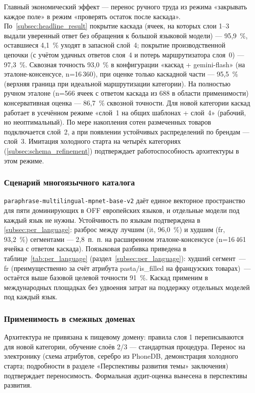Главный экономический эффект — перенос ручного труда из режима «закрывать каждое поле» в режим «проверять остаток после каскада». По~\ref{subsec:headline_result} покрытие каскада (ячеек, на которых слои 1--3 выдали уверенный ответ без обращения к большой языковой модели) — 95,9~\%, оставшиеся 4,1~\% уходят в запасной слой~4; покрытие производственной цепочки (с учётом удачных ответов слоя~4 и потерь маршрутизатора слоя~0) — 97,3~\%. Сквозная точность 93,0~\% в конфигурации «каскад + gemini-flash» (на эталоне-консенсусе, n=16\,360), при оценке только каскадной части — 95,5~\% (верхняя граница при идеальной маршрутизации категории). На полностью ручном эталоне (n=566 ячеек с ответом каскада из 688 в области применимости) консервативная оценка — 86,7~\% сквозной точности. Для новой категории каскад работает в усечённом режиме «слой~1 на общих шаблонах + слой~4» (рабочий, но неоптимальный). По мере накопления сотен размеченных товаров подключается слой~2, а при появлении устойчивых распределений по брендам — слой~3. Имитация холодного старта на четырёх категориях (\ref{subsec:schema_refinement}) подтверждает работоспособность архитектуры в этом режиме.

\subsubsection{Сценарий многоязычного каталога}

\texttt{paraphrase-multilingual-mpnet-base-v2} даёт единое векторное пространство для пяти доминирующих в OFF европейских языков, и отдельные модели под каждый язык не нужны. Устойчивость по языкам подтверждена в \ref{subsec:per_language}: разброс между лучшим (it, 96,0~\%) и худшим (fr, 93,2~\%) сегментами — 2,8~п.~п. на расширенном эталоне-консенсусе (n=16\,461 ячейка с ответом каскада). Поязыковая разбивка приведена в таблице~\ref{tab:per_language} (раздел~\ref{subsec:per_language}): худший сегмент~--- fr (преимущественно за счёт атрибута pasta/is\_filled на французских товарах)~--- остаётся выше базовой целевой точности 91~\%. Каскад применим в международных площадках без удвоения затрат на поддержку отдельных моделей под каждый язык.

\subsubsection{Применимость в смежных доменах}

Архитектура не привязана к пищевому домену: правила слоя 1 переписываются для новой категории, обучение слоёв 2/3 — стандартная процедура. Перенос на электронику (схема атрибутов, серебро из PhoneDB, демонстрация холодного старта; подробности в разделе «Перспективы развития темы» заключения) подтверждает переносимость. Формальная аудит-оценка вынесена в перспективы развития.

